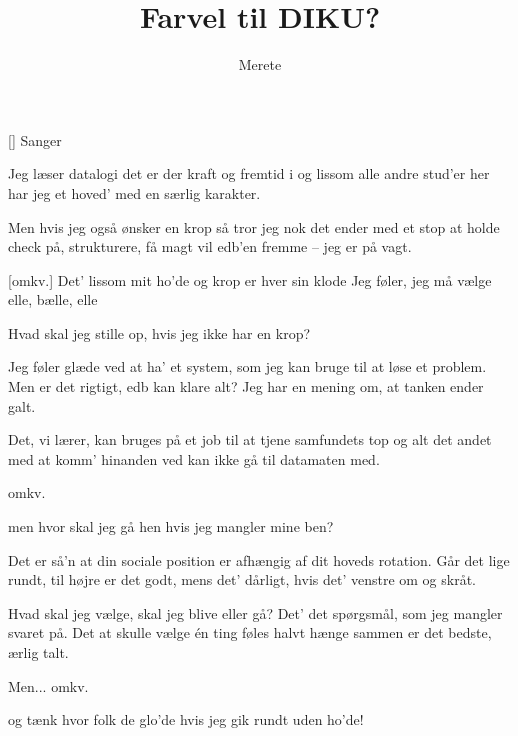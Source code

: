 \documentclass[a4paper,11pt]{article}
\title{Farvel til DIKU?}
\author{Merete}
\begin{document}
\maketitle

\begin{roles}
[] Sanger
\end{roles}

\begin{song}
     Jeg læser datalogi
              det er der kraft og fremtid i
              og lissom alle andre stud'er her
              har jeg et hoved' med en særlig karakter.

     Men hvis jeg også ønsker en krop
              så tror jeg nok det ender med et stop
              at holde check på, strukturere, få magt
              vil edb'en fremme -- jeg er på vagt.

    [omkv.] Det' lissom mit ho'de
                     og krop er hver sin klode
                     Jeg føler, jeg må vælge
                     elle, bælle, elle

     Hvad skal jeg stille op,
              hvis jeg ikke har en krop?

     Jeg føler glæde ved at ha' et system,
              som jeg kan bruge til at løse et problem.
              Men er det rigtigt, edb kan klare alt?
              Jeg har en mening om, at tanken ender galt.

     Det, vi lærer, kan bruges på et job
              til at tjene samfundets top
              og alt det andet med at komm' hinanden ved
              kan ikke gå til datamaten med.

     omkv.

     men hvor skal jeg gå hen
              hvis jeg mangler mine ben?

     Det er så'n at din sociale position
              er afhængig af dit hoveds rotation.
              Går det lige rundt, til højre er det godt,
              mens det' dårligt, hvis det' venstre om og skråt.

     Hvad skal jeg vælge, skal jeg blive eller gå?
              Det' det spørgsmål, som jeg mangler svaret på.
              Det at skulle vælge én ting føles halvt
              hænge sammen er det bedste, ærlig talt.

     Men... omkv.

     og tænk hvor folk de glo'de
              hvis jeg gik rundt uden ho'de!
\end{song}
\end{document}
